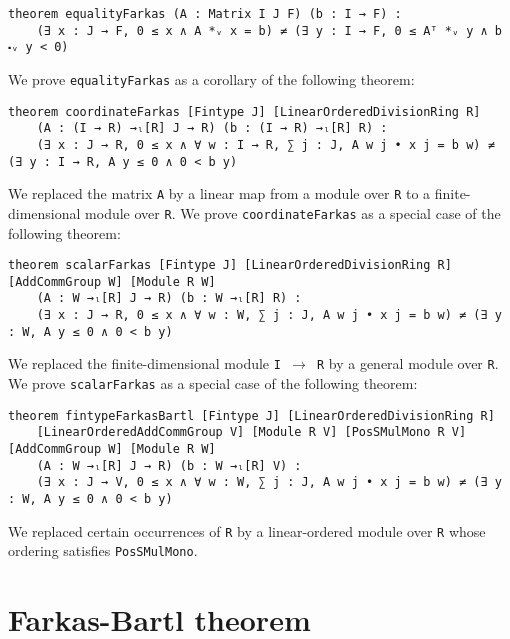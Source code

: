 \documentclass[]{article}
\begin{document}
\begin{lstlisting}
theorem equalityFarkas (A : Matrix I J F) (b : I → F) :
    (∃ x : J → F, 0 ≤ x ∧ A *ᵥ x = b) ≠ (∃ y : I → F, 0 ≤ Aᵀ *ᵥ y ∧ b ⬝ᵥ y < 0)
\end{lstlisting}
We prove \texttt{equalityFarkas} as a corollary of the following theorem:
\begin{lstlisting}
theorem coordinateFarkas [Fintype J] [LinearOrderedDivisionRing R]
    (A : (I → R) →ₗ[R] J → R) (b : (I → R) →ₗ[R] R) :
    (∃ x : J → R, 0 ≤ x ∧ ∀ w : I → R, ∑ j : J, A w j • x j = b w) ≠ (∃ y : I → R, A y ≤ 0 ∧ 0 < b y)
\end{lstlisting}
We replaced the matrix \texttt{A} by a linear map
from a module over \texttt{R} to a finite-dimensional module over \texttt{R}.
We prove \texttt{coordinateFarkas} as a special case of the following theorem:
\begin{lstlisting}
theorem scalarFarkas [Fintype J] [LinearOrderedDivisionRing R] [AddCommGroup W] [Module R W]
    (A : W →ₗ[R] J → R) (b : W →ₗ[R] R) :
    (∃ x : J → R, 0 ≤ x ∧ ∀ w : W, ∑ j : J, A w j • x j = b w) ≠ (∃ y : W, A y ≤ 0 ∧ 0 < b y)
\end{lstlisting}
We replaced the finite-dimensional module \texttt{I $\rightarrow$ R} by a general module over \texttt{R}.
We prove \texttt{scalarFarkas} as a special case of the following theorem:
\begin{lstlisting}
theorem fintypeFarkasBartl [Fintype J] [LinearOrderedDivisionRing R]
    [LinearOrderedAddCommGroup V] [Module R V] [PosSMulMono R V] [AddCommGroup W] [Module R W]
    (A : W →ₗ[R] J → R) (b : W →ₗ[R] V) :
    (∃ x : J → V, 0 ≤ x ∧ ∀ w : W, ∑ j : J, A w j • x j = b w) ≠ (∃ y : W, A y ≤ 0 ∧ 0 < b y)
\end{lstlisting}
We replaced certain occurrences of \texttt{R} by a linear-ordered module over \texttt{R}
whose ordering satisfies \texttt{PosSMulMono}.


\section {Farkas-Bartl theorem}
\end{document}
